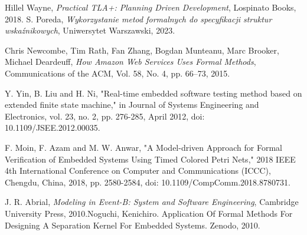 \documentclass[conference]{IEEEtran}
\begin{document}
\begin{thebibliography}{00}
            Hillel Wayne, \emph{Practical TLA+: Planning Driven Development}, Lospinato Books, 2018.
            S. Poreda,
            \textit{Wykorzystanie metod formalnych do specyfikacji struktur wskaźnikowych},
            Uniwersytet Warszawski, 2023.

            Chris Newcombe, Tim Rath, Fan Zhang, Bogdan Munteanu, Marc Brooker, Michael Deardeuff, \emph{How Amazon Web Services Uses Formal Methods}, Communications of the ACM, Vol. 58, No. 4, pp. 66--73, 2015.
            
            Y. Yin, B. Liu and H. Ni, "Real-time embedded software testing method based on extended finite state machine," in Journal of Systems Engineering and Electronics, vol. 23, no. 2, pp. 276-285, April 2012, doi: 10.1109/JSEE.2012.00035.
            
            F. Moin, F. Azam and M. W. Anwar, "A Model-driven Approach for Formal Verification of Embedded Systems Using Timed Colored Petri Nets," 2018 IEEE 4th International Conference on Computer and Communications (ICCC), Chengdu, China, 2018, pp. 2580-2584, doi: 10.1109/CompComm.2018.8780731.
        
            J. R. Abrial, \emph{Modeling in Event-B: System and Software Engineering}, Cambridge University Press, 2010.Noguchi, Kenichiro. Application Of Formal Methods For Designing A Separation Kernel For Embedded Systems. Zenodo, 2010.
            
        \end{thebibliography}
\end{document}

